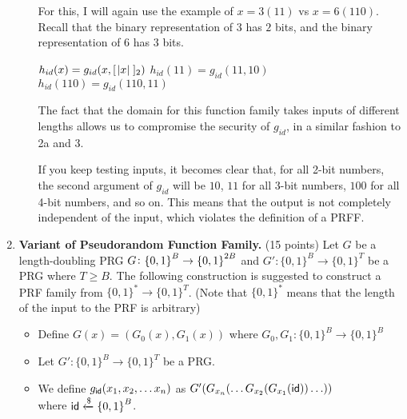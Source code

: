 \documentclass[11pt]{article}
\begin{document}
\begin{enumerate}
\begin{enumerate}
{    For this, I will again use the example of $x=3 (11)$ vs $x=6 (110)$. Recall that the binary representation of $3$ has $2$ bits, and the binary representation of $6$ has $3$ bits. \newline

    $h_{id}(x) = g_{id}(x, [\;\abs x\;]_2)$ \newline
    $h_{id}(11) = g_{id}(11,10)$ \newline
    $h_{id}(110) = g_{id}(110,11)$ \newline

  The fact that the domain for this function family takes inputs of different lengths allows us to compromise the security of $g_{id}$, in a similar fashion to 2a and 3. \newline

    If you keep testing inputs, it becomes clear that, for all 2-bit numbers, the second argument of $g_{id}$ will be $10$, $11$ for all 3-bit numbers, $100$ for all 4-bit numbers, and so on. This means that the output is not completely independent of the input, which violates the definition of a PRFF. \newline
    }
     \newpage
  \end{enumerate} 
  




\item {\bfseries Variant of Pseudorandom Function Family.} (15 points)
  Let $G$ be a length-doubling PRG $G\colon{\{0,1\}}^B\to{\{0,1\}}^{2B}$ and $G' : \{0,1\}^B \rightarrow \{0,1\}^T$ be a PRG where $T\geq B$. 
  The following construction is suggested to construct a PRF family from $\{0,1\}^* \rightarrow \{0,1\}^T$. 
  (Note that $\{0,1\}^{*}$ means that the length of the input to the PRF is arbitrary) 
   \begin{boxedalgo}
 \begin{itemize}
     \item Define $G(x) = (G_0(x), G_1(x))$ where $G_0,G_1 : \{0,1\}^B \rightarrow \{0,1\}^B$
   \item Let $G' : \{0,1\}^B \rightarrow \{0,1\}^T$ be a PRG. 
    \item We define $g_{\mathsf{id}}(x_1,x_2,\ldots x_n)$ as $G'(G_{x_n}(\ldots G_{x_2}(G_{x_1}(\mathsf{id})) \ldots ))$ \\where $\mathsf{id} \xleftarrow[]{\$} {\{0,1\}}^B$.
 \end{itemize}
  \end{boxedalgo}
  

\end{enumerate}
\end{document}
